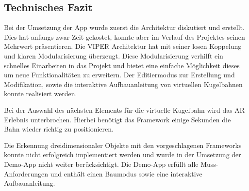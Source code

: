 \subsection{Technisches Fazit}
Bei der Umsetzung der App wurde zuerst die Architektur diskutiert und erstellt. Dies hat anfangs zwar Zeit gekostet, konnte aber im Verlauf des Projektes seinen Mehrwert präsentieren. Die VIPER Architektur hat mit seiner losen Koppelung und klaren Modularisierung überzeugt. Diese Modularisierung verhilft ein schnelles Einarbeiten in das Projekt und bietet eine einfache Möglichkeit dieses um neue Funktionalitäten zu erweitern. Der Editiermodus zur Erstellung und Modifikation, sowie die interaktive Aufbauanleitung von virtuellen Kugelbahnen konnte realisiert werden.

Bei der Auswahl des nächsten Elements für die virtuelle Kugelbahn wird das AR Erlebnis unterbrochen. Hierbei benötigt das Framework einige Sekunden die Bahn wieder richtig zu positionieren.

Die Erkennung dreidimensionaler Objekte mit den vorgeschlagenen Frameworks konnte nicht erfolgreich implementiert werden und wurde in der Umsetzung der Demo-App nicht weiter berücksichtigt. Die Demo-App erfüllt alle Muss-Anforderungen und enthält einen Baumodus sowie eine interaktive Aufbauanleitung.
